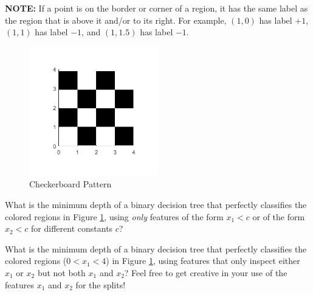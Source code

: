 \documentclass[11pt,addpoints,answers]{exam}
\begin{document}
\begin{questions}
\begin{parts}
    \textbf{NOTE:} If a point is on the border or corner of a region, it has the same label as the region that is above it and/or to its right. For example, $(1, 0)$ has label $+1$, $(1, 1)$ has label $-1$, and $(1, 1.5)$ has label $-1$. 
    \begin{figure}[H]
        \centering
        \includegraphics[width = 0.5\textwidth]{images/checkerboard.png}
        \caption{Checkerboard Pattern} \label{fig:checkerboard}
    \end{figure}
    \begin{subparts}
    

    
    
    \clearpage
    \subpart[2] What is the minimum depth of a binary decision tree that perfectly classifies the colored regions in Figure \ref{fig:checkerboard}, using \emph{only} features of the form $x_1 < c$ or of the form $x_2 < c$ for different constants $c$?
    
    \begin{your_solution}[title=Your Answer,height=2cm,width=5cm]
    \end{your_solution}

    \subpart[2] What is the minimum depth of a binary decision tree that perfectly classifies the colored regions ($0 < x_1 < 4$) in Figure \ref{fig:checkerboard}, using features that only inspect either $x_1$ or $x_2$ but not both $x_1$ and $x_2$? Feel free to get creative in your use of the features $x_1$ and $x_2$ for the splits!
    

\end{subparts}
\end{parts}
\end{questions}
\end{document}
